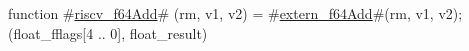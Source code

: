 function #\hyperref[sailRISCVzriscvzyf64Add]{riscv\_f64Add}# (rm, v1, v2) = {
  #\hyperref[sailRISCVzexternzyf64Add]{extern\_f64Add}#(rm, v1, v2);
  (float_fflags[4 .. 0], float_result)
}
